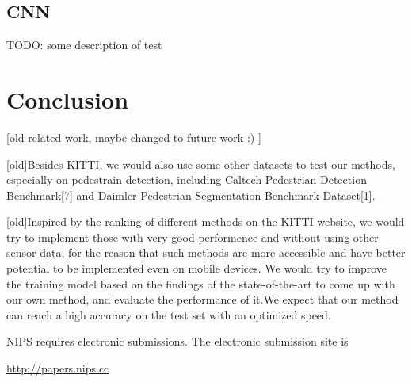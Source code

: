 \documentclass{article} %
\begin{document}
\subsection{CNN}

TODO: some description of test

\section{Conclusion}

[old related work, maybe changed to future work :) ]

[old]Besides KITTI, we would also use some other datasets to test our methods, especially on pedestrain detection, including Caltech Pedestrian Detection Benchmark[7] and Daimler Pedestrian Segmentation Benchmark Dataset[1].

[old]Inspired by the ranking of different methods on the KITTI website, we would try to implement those with very good performence and without using other sensor data, for the reason that such methods are more accessible and have better potential to be implemented even on mobile devices. We would try to improve the training model based on the findings of the state-of-the-art to come up with our own method, and evaluate the performance of it.We expect that our method can reach a high accuracy on the test set with an optimized speed. 

\iffalse 


NIPS requires electronic submissions.  The electronic submission site is  
\begin{center}
   \url{http://papers.nips.cc}
\end{center}
\end{document}
